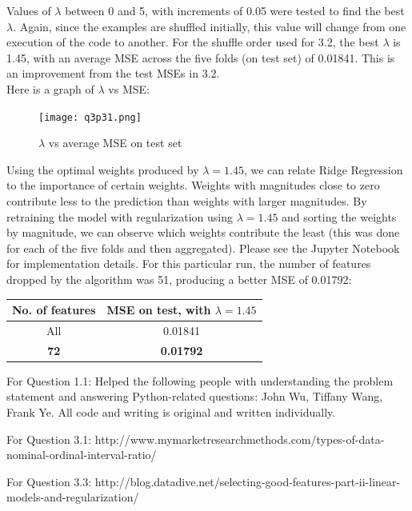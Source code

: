 \documentclass[paper=a4, fontsize=11pt]{scrartcl} %
\numberwithin{equation}{section} %
\numberwithin{figure}{section} %
\numberwithin{table}{section} %
\begin{document}
Values of \(\lambda\) between 0 and 5, with increments of 0.05 were tested to find the best \(\lambda\). Again, since the examples are shuffled initially, this value will change from one execution of the code to another. For the shuffle order used for 3.2, the best \(\lambda\) is 1.45, with an average MSE across the five folds (on test set) of 0.01841. This is an improvement from the test MSEs in 3.2. \\

Here is a graph of \(\lambda\) vs MSE:
\begin{figure}[H]
    \texttt{[image: q3p31.png]}
    \caption{\(\lambda\) vs average MSE on test set}
    \label{fig:q3p31}
\end{figure}

Using the optimal weights produced by \(\lambda = 1.45\), we can relate Ridge Regression to the importance of certain weights. Weights with magnitudes close to zero contribute less to the prediction than weights with larger magnitudes. By retraining the model with regularization using \(\lambda = 1.45\) and sorting the weights by magnitude, we can observe which weights contribute the least (this was done for each of the five folds and then aggregated). Please see the Jupyter Notebook for implementation details. For this particular run, the number of features dropped by the algorithm was 51, producing a better MSE of 0.01792:

\begin{center}
\begin{tabular}{ |c|c| } 
    \hline
    \textbf{No. of features} & \textbf{MSE on test, with \(\lambda = 1.45\)} \\
    \hline
    All & 0.01841 \\
    \textbf{72} &  \textbf{0.01792} \\ 
    \hline
\end{tabular}
\end{center}

\newpage

\begin{thebibliography}{9}
For Question 1.1: Helped the following people with understanding the problem statement and answering Python-related questions: John Wu, Tiffany Wang, Frank Ye. All code and writing is original and written individually.

For Question 3.1: http://www.mymarketresearchmethods.com/types-of-data-nominal-ordinal-interval-ratio/

For Question 3.3: http://blog.datadive.net/selecting-good-features-part-ii-linear-models-and-regularization/
\end{thebibliography}
\end{document}
